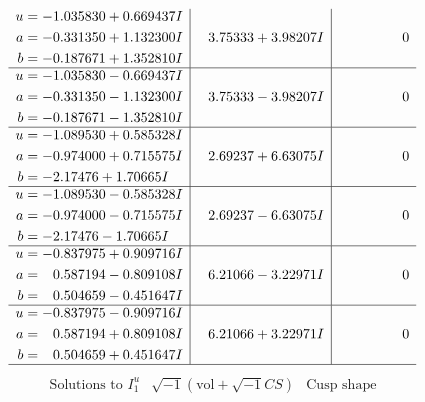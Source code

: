 \documentclass[1p]{elsarticle_modified}
\theoremstyle{definition}
\newcommand{\I}{\sqrt{-1}}
\begin{document}
$$\begin{array}{c|c|c}
\begin{aligned}
u &= -1.035830 + 0.669437 I \\
a &= -0.331350 + 1.132300 I \\
b &= -0.187671 + 1.352810 I\end{aligned}
 & \phantom{-}3.75333 + 3.98207 I & \phantom{-0.000000 } 0 \\ \hline\begin{aligned}
u &= -1.035830 - 0.669437 I \\
a &= -0.331350 - 1.132300 I \\
b &= -0.187671 - 1.352810 I\end{aligned}
 & \phantom{-}3.75333 - 3.98207 I & \phantom{-0.000000 } 0 \\ \hline\begin{aligned}
u &= -1.089530 + 0.585328 I \\
a &= -0.974000 + 0.715575 I \\
b &= -2.17476 + 1.70665 I\end{aligned}
 & \phantom{-}2.69237 + 6.63075 I & \phantom{-0.000000 } 0 \\ \hline\begin{aligned}
u &= -1.089530 - 0.585328 I \\
a &= -0.974000 - 0.715575 I \\
b &= -2.17476 - 1.70665 I\end{aligned}
 & \phantom{-}2.69237 - 6.63075 I & \phantom{-0.000000 } 0 \\ \hline\begin{aligned}
u &= -0.837975 + 0.909716 I \\
a &= \phantom{-}0.587194 - 0.809108 I \\
b &= \phantom{-}0.504659 - 0.451647 I\end{aligned}
 & \phantom{-}6.21066 - 3.22971 I & \phantom{-0.000000 } 0 \\ \hline\begin{aligned}
u &= -0.837975 - 0.909716 I \\
a &= \phantom{-}0.587194 + 0.809108 I \\
b &= \phantom{-}0.504659 + 0.451647 I\end{aligned}
 & \phantom{-}6.21066 + 3.22971 I & \phantom{-0.000000 } 0\\
 \hline 
 \end{array}$$\newpage$$\begin{array}{c|c|c}  
\text{Solutions to }I^u_{1}& \I (\text{vol} + \sqrt{-1}CS) & \text{Cusp shape}\\
 \hline 
\begin{aligned}

\end{aligned}
\end{array}$$
\end{document}

